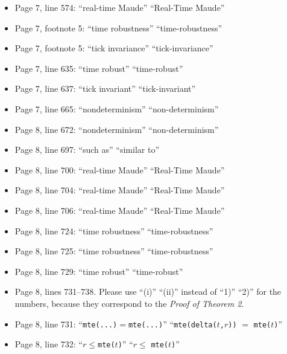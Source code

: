 \documentclass[12pt,onecolumn]{IEEEtranTIE}
\begin{document}
\begin{itemize}
\item Page 7, line 574: ``real-time Maude'' \by ``Real-Time Maude''

\item Page 7, footnote 5: ``time robustness'' \by ``time-robustness''

\item Page 7, footnote 5: ``tick invariance'' \by ``tick-invariance''
  
\item Page 7, line 635: ``time robust'' \by ``time-robust''

\item Page 7, line 637: ``tick invariant'' \by ``tick-invariant''

\item Page 7, line 665: ``nondeterminism'' \by ``non-determinism''

\item Page 8, line 672: ``nondeterminism'' \by ``non-determinism''

\item Page 8, line 697: ``such as'' \by ``similar to''

\item Page 8, line 700: ``real-time Maude'' \by ``Real-Time Maude''

\item Page 8, line 704: ``real-time Maude'' \by ``Real-Time Maude''

\item Page 8, line 706: ``real-time Maude'' \by ``Real-Time Maude''

\item Page 8, line 724: ``time robustness'' \by ``time-robustness''

\item Page 8, line 725: ``time robustness'' \by ``time-robustness''

\item Page 8, line 729: ``time robust'' \by ``time-robust''

\item Page 8, lines 731--738. Please use ``(i)'' ``(ii)'' instead of
  ``1)'' ``2)'' for the numbers, because they correspond to the
  \emph{Proof of Theorem 2}.

\item Page 8, line 731: ``\verb|mte(...)|$=$\verb|mte(...)|'' \by
  ``\verb|mte(delta(|$t$\verb|,|$r$\verb|))| $=$
  \verb|mte(|$t$\verb|)|''

\item Page 8, line 732: ``$r\le$\verb|mte(|$t$\verb|)|'' \by ``$r\le$
  \verb|mte(|$t$\verb|)|''


\end{itemize}
\end{document}
